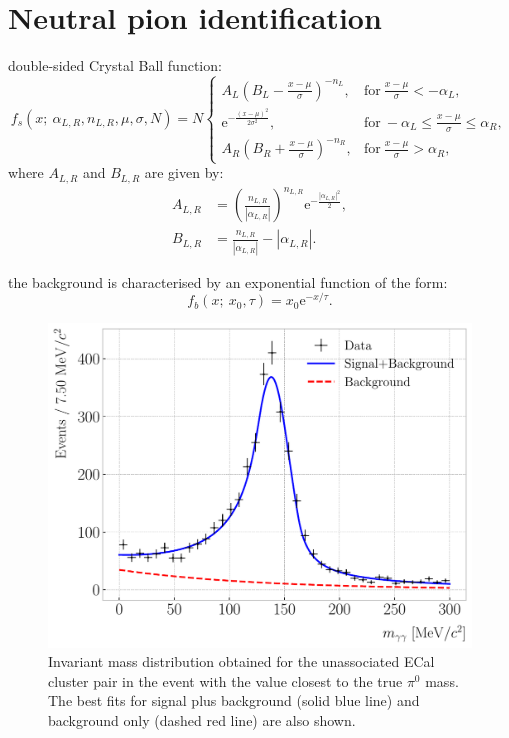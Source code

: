 \section{Neutral pion identification}

double-sided Crystal Ball function:
\begin{equation}
    f_{s} (x; ~\alpha_{L,R}, n_{L,R}, \mu, \sigma, N) = N \left\{
    \begin{array}{ll}
        A_{L} \left(B_{L} - \frac{x - \mu}{\sigma}\right)^{-n_{L}}, & \mathrm{for} \ \frac{x - \mu}{\sigma} < -\alpha_{L},\\
        \mathrm{e}^{-\frac{(x-\mu)^{2}}{2 \sigma^{2}}}, & \mathrm{for} \ -\alpha_{L} \leq \frac{x - \mu}{\sigma} \leq \alpha_{R},\\
        A_{R} \left(B_{R} + \frac{x - \mu}{\sigma}\right)^{-n_{R}}, & \mathrm{for} \ \frac{x - \mu}{\sigma} > \alpha_{R},
    \end{array}
    \right.
\end{equation}
where $A_{L,R}$ and $B_{L,R}$ are given by:
\begin{equation}
\begin{split}
    A_{L,R} &= \left(\frac{n_{L,R}}{|\alpha_{L,R}|}\right)^{n_{L,R}} \mathrm{e}^{-\frac{|\alpha_{L,R}|^{2}}{2}},\\
    B_{L,R} &= \frac{n_{L,R}}{|\alpha_{L,R}|}-|\alpha_{L,R}|.
\end{split}
\end{equation}

the background is characterised by an exponential function of the form:
\begin{equation}
    f_{b} (x; ~x_{0}, \tau) = x_{0} \mathrm{e}^{-x/\tau}.
\end{equation}

\begin{figure}[t]
    \centering
    \includegraphics[width=.80\linewidth]{Images/GAr_selection/numuCC_1pizero_selection_biased.pdf}
    \caption[Invariant mass distribution obtained for the unassociated ECal cluster pair in the event with the value closest to the true $\pi^{0}$ mass.]{Invariant mass distribution obtained for the unassociated ECal cluster pair in the event with the value closest to the true $\pi^{0}$ mass. The best fits for signal plus background (solid blue line) and background only (dashed red line) are also shown.}
    \label{fig:pizero_invariant_mass_biased}
\end{figure}


